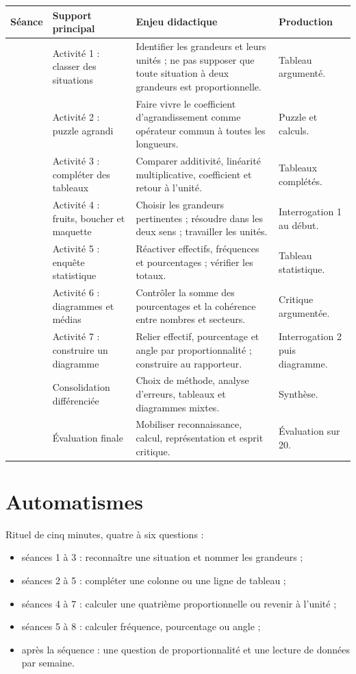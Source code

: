 \documentclass[12pt,a4paper]{article}
\begin{document}
\renewcommand{\arraystretch}{1.38}
\begin{tabularx}{\textwidth}{
|>{\centering\arraybackslash}p{1.05cm}
|>{\raggedright\arraybackslash}p{4cm}
|>{\raggedright\arraybackslash}X
|>{\raggedright\arraybackslash}p{3.1cm}|}
\hline
\textbf{Séance} & \textbf{Support principal} & \textbf{Enjeu didactique} & \textbf{Production}\\
\hline
1 & Activité 1 : classer des situations & Identifier les grandeurs et leurs unités ; ne pas supposer que toute situation à deux grandeurs est proportionnelle. & Tableau argumenté.\\
\hline
2 & Activité 2 : puzzle agrandi & Faire vivre le coefficient d'agrandissement comme opérateur commun à toutes les longueurs. & Puzzle et calculs.\\
\hline
3 & Activité 3 : compléter des tableaux & Comparer additivité, linéarité multiplicative, coefficient et retour à l'unité. & Tableaux complétés.\\
\hline
4 & Activité 4 : fruits, boucher et maquette & Choisir les grandeurs pertinentes ; résoudre dans les deux sens ; travailler les unités. & Interrogation 1 au début.\\
\hline
5 & Activité 5 : enquête statistique & Réactiver effectifs, fréquences et pourcentages ; vérifier les totaux. & Tableau statistique.\\
\hline
6 & Activité 6 : diagrammes et médias & Contrôler la somme des pourcentages et la cohérence entre nombres et secteurs. & Critique argumentée.\\
\hline
7 & Activité 7 : construire un diagramme & Relier effectif, pourcentage et angle par proportionnalité ; construire au rapporteur. & Interrogation 2 puis diagramme.\\
\hline
8 & Consolidation différenciée & Choix de méthode, analyse d'erreurs, tableaux et diagrammes mixtes. & Synthèse.\\
\hline
9 & Évaluation finale & Mobiliser reconnaissance, calcul, représentation et esprit critique. & Évaluation sur 20.\\
\hline
\end{tabularx}

\section*{Automatismes}

Rituel de cinq minutes, quatre à six questions :

\begin{itemize}
  \item séances 1 à 3 : reconnaître une situation et nommer les grandeurs ;
  \item séances 2 à 5 : compléter une colonne ou une ligne de tableau ;
  \item séances 4 à 7 : calculer une quatrième proportionnelle ou revenir à l'unité ;
  \item séances 5 à 8 : calculer fréquence, pourcentage ou angle ;
  \item après la séquence : une question de proportionnalité et une lecture de données par semaine.
\end{itemize}
\end{document}
